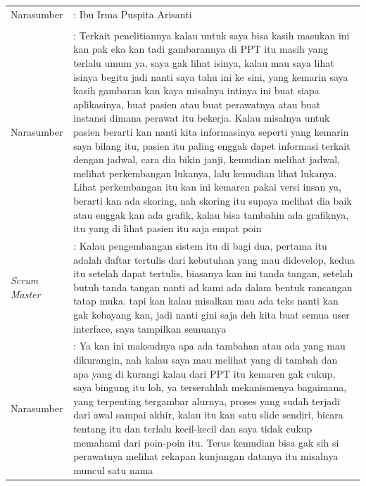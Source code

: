 
\begin{table}[h!]
	\centering
\begin{center}
		
\begin{tabular}{ p{2.8cm} p{11cm}}
	
Narasumber & : Ibu Irma Puspita Arisanti\\

&\\

Narasumber & : Terkait penelitiannya kalau untuk saya bisa kasih masukan ini kan pak eka kan tadi gambarannya di PPT itu masih yang terlalu umum ya, saya gak lihat isinya, kalau mau saya lihat isinya begitu jadi nanti saya tahu ini ke sini, yang kemarin saya kasih gambaran kan kaya misalnya intinya ini buat siapa aplikasinya, buat pasien atau buat perawatnya atau buat instansi dimana perawat itu bekerja. Kalau misalnya untuk pasien berarti kan nanti kita informasinya seperti yang kemarin saya bilang itu, pasien itu paling enggak dapet informasi terkait dengan jadwal, cara dia bikin janji, kemudian melihat jadwal, melihat perkembangan lukanya, lalu kemudian lihat lukanya. Lihat perkembangan itu kan ini kemaren pakai versi insan ya, berarti kan ada skoring, nah skoring itu supaya melihat dia baik atau enggak kan ada grafik, kalau bisa tambahin ada grafiknya, itu yang di lihat pasien itu saja empat poin\\
	
\emph{Scrum Master} & : Kalau pengembangan sistem itu di bagi dua, pertama itu adalah daftar tertulis dari kebutuhan yang mau didevelop, kedua itu setelah dapat tertulis, biasanya kan ini tanda tangan, setelah butuh tanda tangan nanti ad kami ada dalam bentuk rancangan tatap muka. tapi kan kalau misalkan mau ada teks nanti kan gak kebayang kan, jadi nanti gini saja deh kita buat semua user interface, saya tampilkan semuanya\\

Narasumber & : Ya kan ini maksudnya apa ada tambahan atau ada yang mau dikurangin, nah kalau saya mau melihat yang di tambah dan apa yang di kurangi kalau dari PPT itu kemaren gak cukup, saya bingung itu loh, ya terserahlah mekanismenya bagaimana, yang terpenting tergambar alurnya, proses yang sudah terjadi dari awal sampai akhir, kalau itu kan satu slide sendiri, bicara tentang itu dan terlalu kecil-kecil dan saya tidak cukup memahami dari poin-poin itu. Terus kemudian bisa gak sih si perawatnya melihat rekapan kunjungan datanya itu misalnya muncul satu nama 

\end{tabular}

\end{center}
\end{table}
